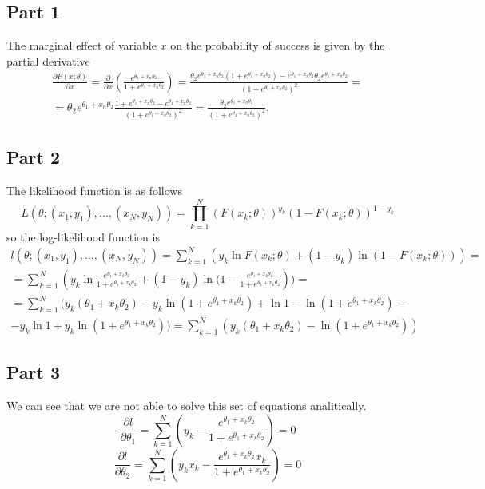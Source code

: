 \documentclass[12pt, a4paper]{article}\usepackage[]{graphicx}\usepackage[]{color}
\begin{document}
\subsection{Part 1}
The marginal effect of variable $x$ on the probability of success is given by the partial derivative
\begin{gather*} 
  \frac{\partial F(x; \theta)}{\partial x} =   
  \frac{\partial}{\partial x} \left(  \frac{e^{\theta_1 + x_n \theta_2}}{1+e^{\theta_1 + x_n \theta_2}}  \right) = 
  \frac{\theta_2 e^{\theta_1 + x_n \theta_2} (1+e^{\theta_1 + x_n \theta_2}) -  e^{\theta_1 + x_n \theta_2} \theta_2 e^{\theta_1 + x_n \theta_2} }
    {\left( 1+e^{\theta_1 + x_n \theta_2} \right)^2 } = \\ =
  \theta_2 e^{\theta_1 + x_n \theta_2} \frac{1+ e^{\theta_1 + x_n \theta_2} -e^{\theta_1 + x_n \theta_2} }
    {\left( 1+e^{\theta_1 + x_n \theta_2} \right)^2 } =
  \frac{\theta_2 e^{\theta_1 + x_n \theta_2}}{\left( 1+e^{\theta_1 + x_n \theta_2} \right)^2 }.
\end{gather*}


\subsection{Part 2}
The likelihood function is as follows
\[L(\theta;(x_{1},y_{1}),...,(x_{N},y_{N}))=\prod_{k=1}^{N}(F(x_{k};\theta))^{y_{k}}(1-F(x_{k};\theta))^{1-y_{k}}\]
so the log-likelihood function is 
\begin{gather*}
  l(\theta;(x_{1},y_{1}),...,(x_{N},y_{N}))=\sum_{k=1}^{N}(y_{k}\ln{F(x_{k};\theta)}+(1-y_{k})\ln{(1-F(x_{k};\theta))})=\\
    =\sum_{k=1}^{N}(y_{k}
      \ln{\frac{e^{\theta_{1}+x_{k}\theta_{2}}}{1+e^{\theta_{1}+x_{k}\theta_{2}}}}
      +(1-y_{k})\ln{(1-\frac{e^{\theta_{1}+x_{k}\theta_{2}}}{1+e^{\theta_{1}+x_{k}\theta_{2}}}}))=\\
    =\sum_{k=1}^{N}(y_{k}(\theta_{1}+x_{k}\theta_{2})-y_{k}\ln{(1+e^{\theta_{1}+x_{k}\theta_{2}})}+\ln{1}-\ln{(1+e^{\theta_{1}+x_{k}\theta_{2}})}-\\
      -y_{k}\ln{1}+y_{k}\ln{(1+e^{\theta_{1}+x_{k}\theta_{2}})})
    =\sum_{k=1}^{N}(y_{k}(\theta_{1}+x_{k}\theta_{2})-\ln{(1+e^{\theta_{1}+x_{k}\theta_{2}})})
\end{gather*}


\subsection{Part 3}
We can see that we are not able to solve this set of equations analitically.
\[\frac{\partial l}{\partial\theta_{1}}=\sum_{k=1}^{N}(y_{k}-\frac{e^{\theta_{1}+x_{k}\theta_{2}}}{1+e^{\theta_{1}+x_{k}\theta_{2}}})=0\]
\[\frac{\partial l}{\partial\theta_{2}}=\sum_{k=1}^{N}(y_{k}x_{k}-\frac{e^{\theta_{1}+x_{k}\theta_{2}}x_{k}}{1+e^{\theta_{1}+x_{k}\theta_{2}}})=0\]
\end{document}
